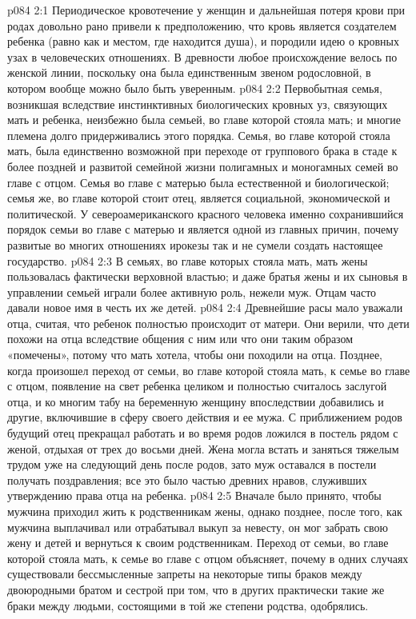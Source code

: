 \vs p084 2:1 Периодическое кровотечение у женщин и дальнейшая потеря крови при родах довольно рано привели к предположению, что кровь является создателем ребенка (равно как и местом, где находится душа), и породили идею о кровных узах в человеческих отношениях. В древности любое происхождение велось по женской линии, поскольку она была единственным звеном родословной, в котором вообще можно было быть уверенным.
\vs p084 2:2 Первобытная семья, возникшая вследствие инстинктивных биологических кровных уз, связующих мать и ребенка, неизбежно была семьей, во главе которой стояла мать; и многие племена долго придерживались этого порядка. Семья, во главе которой стояла мать, была единственно возможной при переходе от группового брака в стаде к более поздней и развитой семейной жизни полигамных и моногамных семей во главе с отцом. Семья во главе с матерью была естественной и биологической; семья же, во главе которой стоит отец, является социальной, экономической и политической. У североамериканского красного человека именно сохранившийся порядок семьи во главе с матерью и является одной из главных причин, почему развитые во многих отношениях ирокезы так и не сумели создать настоящее государство.
\vs p084 2:3 В семьях, во главе которых стояла мать, мать жены пользовалась фактически верховной властью; и даже братья жены и их сыновья в управлении семьей играли более активную роль, нежели муж. Отцам часто давали новое имя в честь их же детей.
\vs p084 2:4 Древнейшие расы мало уважали отца, считая, что ребенок полностью происходит от матери. Они верили, что дети похожи на отца вследствие общения с ним или что они таким образом «помечены», потому что мать хотела, чтобы они походили на отца. Позднее, когда произошел переход от семьи, во главе которой стояла мать, к семье во главе с отцом, появление на свет ребенка целиком и полностью считалось заслугой отца, и ко многим табу на беременную женщину впоследствии добавились и другие, включившие в сферу своего действия и ее мужа. С приближением родов будущий отец прекращал работать и во время родов ложился в постель рядом с женой, отдыхая от трех до восьми дней. Жена могла встать и заняться тяжелым трудом уже на следующий день после родов, зато муж оставался в постели получать поздравления; все это было частью древних нравов, служивших утверждению права отца на ребенка.
\vs p084 2:5 Вначале было принято, чтобы мужчина приходил жить к родственникам жены, однако позднее, после того, как мужчина выплачивал или отрабатывал выкуп за невесту, он мог забрать свою жену и детей и вернуться к своим родственникам. Переход от семьи, во главе которой стояла мать, к семье во главе с отцом объясняет, почему в одних случаях существовали бессмысленные запреты на некоторые типы браков между двоюродными братом и сестрой при том, что в других практически такие же браки между людьми, состоящими в той же степени родства, одобрялись.
